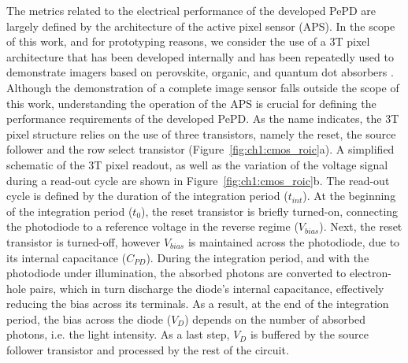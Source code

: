 The metrics related to the electrical performance of the developed PePD are largely defined by the architecture of the active pixel sensor (APS). In the scope of this work, and for prototyping reasons, we consider the use of a 3T pixel architecture that has been developed internally and has been repeatedly used to demonstrate imagers based on perovskite, organic, and quantum dot absorbers \cite{Song2024Lead-FreeSensors, Pejovic2021Thin-FilmImaging, Song2024HalideImager, Siddik2023Interface-EngineeredApplications}. Although the demonstration of a complete image sensor falls outside the scope of this work, understanding the operation of the APS is crucial for defining the performance requirements of the developed PePD. As the name indicates, the 3T pixel structure relies on the use of three transistors, namely the reset, the source follower and the row select transistor (Figure~\ref{fig:ch1:cmos_roic}a). A simplified schematic of the 3T pixel readout, as well as the variation of the voltage signal during a read-out cycle are shown in Figure~\ref{fig:ch1:cmos_roic}b. The read-out cycle is defined by the duration of the integration period ($t_{int}$). At the beginning of the integration period ($t_0$), the reset transistor is briefly turned-on, connecting the photodiode to a reference voltage in the reverse regime ($V_{bias}$). Next, the reset transistor is turned-off, however $V_{bias}$ is maintained across the photodiode, due to its internal capacitance ($C_{PD}$). During the integration period, and with the photodiode under illumination, the absorbed photons are converted to electron-hole pairs, which in turn discharge the diode's internal capacitance, effectively reducing the bias across its terminals. As a result, at the end of the integration period, the bias across the diode ($V_D$) depends on the number of absorbed photons, i.e. the light intensity. As a last step, $V_D$ is buffered by the source follower transistor and processed by the rest of the circuit. 

